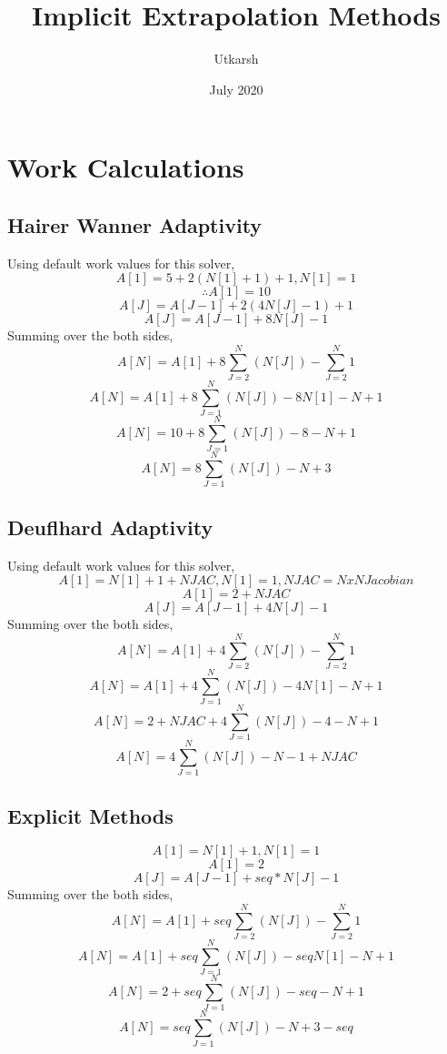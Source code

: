 \documentclass[a4paper,12pt]{extarticle}
\title{Implicit Extrapolation Methods}
\author{Utkarsh}
\date{July 2020}
\begin{document}
\maketitle

\section{Work Calculations}
\subsection{Hairer Wanner Adaptivity}

Using default work values for this solver,
\[A[1]=5 + 2(N[1] + 1) + 1 , N[1] = 1\]
\[\therefore A[1] = 10\]
\[A[J] = A[J-1] + 2(4N[J]-1) + 1\]
\[A[J] = A[J-1] + 8N[J] - 1\]
Summing over the both sides,
\[A[N] = A[1] + 8\sum_{J=2}^{N}(N[J]) - \sum_{J=2}^{N}1\]
\[A[N] = A[1] + 8\sum_{J=1}^{N}(N[J]) - 8N[1] - N + 1\]
\[A[N] = 10 + 8\sum_{J=1}^{N}(N[J]) - 8 - N + 1\]
\[\boxed{A[N] = 8\sum_{J=1}^{N}(N[J]) - N + 3}\]
\subsection{Deuflhard Adaptivity}
Using default work values for this solver,
\[A[1] = N[1] + 1 + NJAC, N[1] = 1, NJAC = NxN Jacobian\]
\[A[1] = 2 + NJAC\]
\[A[J] = A[J-1] + 4N[J] - 1\]
Summing over the both sides,
\[A[N] = A[1] + 4\sum_{J=2}^{N}(N[J]) - \sum_{J=2}^{N}1\]
\[A[N] = A[1] + 4\sum_{J=1}^{N}(N[J]) - 4N[1] - N + 1\]
\[A[N] = 2 + NJAC + 4\sum_{J=1}^{N}(N[J]) - 4 - N + 1\]
\[\boxed{A[N] = 4\sum_{J=1}^{N}(N[J]) - N - 1 + NJAC}\]
\subsection{Explicit Methods}
\[A[1] = N[1] + 1, N[1] = 1\]
\[A[1] = 2\]
\[A[J] = A[J-1] + seq*N[J] - 1\]
Summing over the both sides,
\[A[N] = A[1] + seq\sum_{J=2}^{N}(N[J]) - \sum_{J=2}^{N}1\]
\[A[N] = A[1] + seq\sum_{J=1}^{N}(N[J]) - seqN[1] - N + 1\]
\[A[N] = 2 + seq\sum_{J=1}^{N}(N[J]) - seq - N + 1\]
\[\boxed{A[N] = seq\sum_{J=1}^{N}(N[J]) - N + 3 - seq}\]
\end{document}
